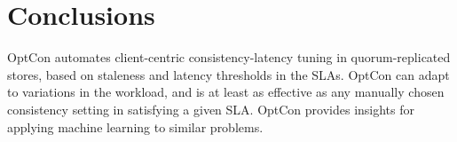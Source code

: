 \documentclass[conference]{IEEEtran}
\begin{document}
\section{Conclusions}\label{sec:conclusion}
OptCon automates client-centric consistency-latency tuning in quorum-replicated stores, based on staleness and latency thresholds in the SLAs. OptCon can adapt to variations in the workload, and is at least as effective as any manually chosen consistency setting in satisfying a given SLA. OptCon provides insights for applying machine learning to similar problems.

\renewcommand{\bibfont}{\footnotesize}


\end{document}
